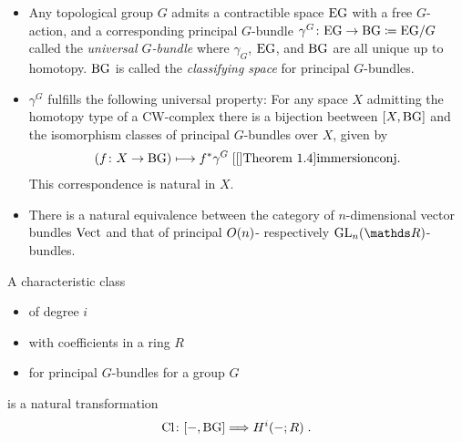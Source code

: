 \begin{Def} 
  \begin{itemize}
  \item Any topological group $G$ admits a contractible space $\text{E}\text{G}$ with a
    free $G$-action, and a corresponding principal $G$-bundle
    $\gamma^G\colon \text{E}\text{G}\to\text{BG}\coloneqq \text{E}\text{G}/G$ called the
    \emph{universal $G$-bundle}
    where $\gamma_G$, $\text{E}\text{G}$, and $\text{BG}$ are all unique up to
    homotopy. %
    $\text{BG}$ is called the \emph{classifying space} for principal
    $G$-bundles.
  \item $\gamma^G$ fulfills the following universal property:
    For any space $X$ admitting the homotopy type of a CW-complex
    there is a bijection beetween $[X,\text{BG}]$ and the isomorphism classes of
    principal $G$-bundles over $X$, given by
    \begin{gather*}
      \left(f\colon X\to\BG \right) \longmapsto \pb f \gamma^G
      \;
      \text{\optcite[Theorem 1.4]{immersionconj}}.
    \end{gather*}
    This correspondence is natural in $X$.
  \item There is a natural equivalence between the category of
    $n$-dimensional vector bundles $\text{Vect}$ and that of principal
    $O(n)$- respectively $\GL n$-bundles.
  \end{itemize}
\end{Def}

\begin{Def}
  A characteristic class
  \begin{itemize}
  \item of degree $i$
  \item with coefficients in a ring $R$
  \item for principal $G$-bundles for a group $G$
  \end{itemize}
  is a natural transformation
  \begin{gather*}
    \text{Cl}\colon [-, \text{BG}] \Longrightarrow H^i(-; R)\;.
  \end{gather*}
\end{Def}
  
